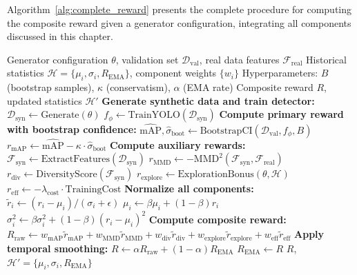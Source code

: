 Algorithm~\ref{alg:complete_reward} presents the complete procedure for computing the composite reward given a generator configuration, integrating all components discussed in this chapter.

\begin{algorithm}[t]
\caption{Complete Composite Reward Computation}
\label{alg:complete_reward}
\begin{algorithmic}[1]
\Require Generator configuration $\theta$, validation set $\mathcal{D}_{\text{val}}$, real data features $\mathcal{F}_{\text{real}}$
\Require Historical statistics $\mathcal{H} = \{\mu_i, \sigma_i, R_{\text{EMA}}\}$, component weights $\{w_i\}$
\Require Hyperparameters: $B$ (bootstrap samples), $\kappa$ (conservatism), $\alpha$ (EMA rate)
\Ensure Composite reward $R$, updated statistics $\mathcal{H}'$
\State \textbf{Generate synthetic data and train detector:}
\State $\mathcal{D}_{\text{syn}} \gets \text{Generate}(\theta)$
\State $f_\phi \gets \text{TrainYOLO}(\mathcal{D}_{\text{syn}})$
\State
\State \textbf{Compute primary reward with bootstrap confidence:}
\State $\widehat{\text{mAP}}, \hat{\sigma}_{\text{boot}} \gets \text{BootstrapCI}(\mathcal{D}_{\text{val}}, f_\phi, B)$ 
\State $r_{\text{mAP}} \gets \widehat{\text{mAP}} - \kappa \cdot \hat{\sigma}_{\text{boot}}$
\State
\State \textbf{Compute auxiliary rewards:}
\State $\mathcal{F}_{\text{syn}} \gets \text{ExtractFeatures}(\mathcal{D}_{\text{syn}})$
\State $r_{\text{MMD}} \gets -\text{MMD}^2(\mathcal{F}_{\text{syn}}, \mathcal{F}_{\text{real}})$
\State $r_{\text{div}} \gets \text{DiversityScore}(\mathcal{F}_{\text{syn}})$
\State $r_{\text{explore}} \gets \text{ExplorationBonus}(\theta, \mathcal{H})$
\State $r_{\text{eff}} \gets -\lambda_{\text{cost}} \cdot \text{TrainingCost}$
\State
\State \textbf{Normalize all components:}
    \State $\tilde{r}_i \gets (r_i - \mu_i) / (\sigma_i + \epsilon)$
    \State $\mu_i \gets \beta \mu_i + (1-\beta) r_i$ 
    \State $\sigma_i^2 \gets \beta \sigma_i^2 + (1-\beta)(r_i - \mu_i)^2$ 
\EndFor
\State
\State \textbf{Compute composite reward:}
\State $R_{\text{raw}} \gets w_{\text{mAP}} \tilde{r}_{\text{mAP}} + w_{\text{MMD}} \tilde{r}_{\text{MMD}} + w_{\text{div}} \tilde{r}_{\text{div}} + w_{\text{explore}} \tilde{r}_{\text{explore}} + w_{\text{eff}} \tilde{r}_{\text{eff}}$
\State
\State \textbf{Apply temporal smoothing:}
\State $R \gets \alpha R_{\text{raw}} + (1-\alpha) R_{\text{EMA}}$
\State $R_{\text{EMA}} \gets R$
\State
\State \Return $R$, $\mathcal{H}' = \{\mu_i, \sigma_i, R_{\text{EMA}}\}$
\end{algorithmic}
\end{algorithm}

